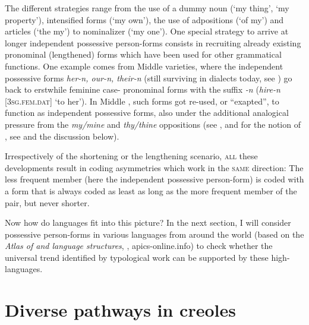 \documentclass[output=paper]{langsci/langscibook}
\begin{document}
The different strategies range from the use of a dummy noun (‘my thing’, ‘my property’), intensified  forms (‘my own’), the use of adpositions (‘of my’) and  articles (‘the my’) to  nominalizer (‘my one’). One special strategy to arrive at longer independent possessive person-forms consists in recruiting already existing pronominal (lengthened) forms which have been used for other grammatical functions. One example comes from Middle  varieties, where the independent possessive forms \textit{her-n, our-n, their-n} (still surviving in  dialects today, see \citealt{KortmannLunkenheimer2013}) go back to erstwhile feminine  case- pronominal forms with the suffix \textit{{}-n} (\textit{hire-n} [\textsc{3sg.fem.dat}] ‘to her’). In Middle , such  forms got re-used, or “exapted”, to function as independent possessive forms, also under the additional analogical pressure from the \textit{my/mine} and \textit{thy/thine} oppositions (see \citealt{Allen2002}, and for the notion of , see \citealt{Lass1990,Lass2017,NordeVandeVelde2016} and the discussion below). 

Irrespectively of the shortening or the lengthening scenario, \textsc{all} these developments result in coding asymmetries which work in the \textsc{same} direction: The less frequent member (here the independent possessive person-form) is coded with a form that is always coded as least as long as the more frequent member of the pair, but never shorter.

Now how do  languages fit into this picture? In the next section, I will consider possessive person-forms in various  languages from around the world (based on the \textit{Atlas of  and  language structures}, \citealt{MichaelisEtAl2013}, apics-online.info) to check whether the universal trend identified by typological work can be supported by these high- languages.

\section{Diverse pathways in creoles}\label{sec:michaelis:4}
\end{document}
